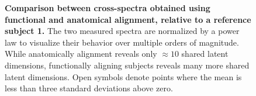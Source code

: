 \documentclass[10pt]{article}
\begin{document}
\begin{figure}[H]


\caption{\label{fig-cross-detectability}\textbf{Comparison between
cross-spectra obtained using functional and anatomical alignment,
relative to a reference subject 1.} The two measured spectra are
normalized by a power law to visualize their behavior over multiple
orders of magnitude. While anatomically alignment reveals only
\(\approx 10\) shared latent dimensions, functionally aligning subjects
reveals many more shared latent dimensions. Open symbols denote points
where the mean is less than three standard deviations above zero.}

\end{figure}%
\end{document}
